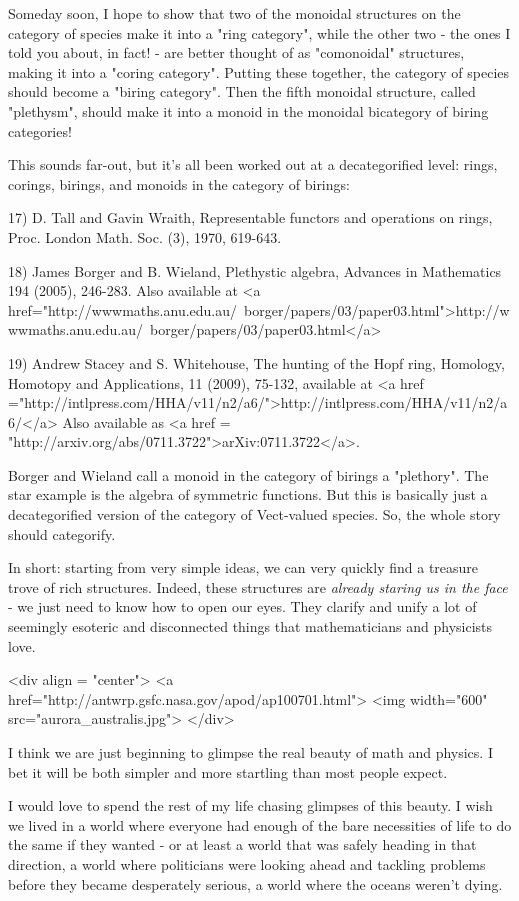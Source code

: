 Someday soon, I hope to show that two of the monoidal structures on
the category of species make it into a "ring category", while the
other two - the ones I told you about, in fact! - are better thought
of as "comonoidal" structures, making it into a "coring category".
Putting these together, the category of species should become a
"biring category".  Then the fifth monoidal structure, called
"plethysm", should make it into a monoid in the monoidal bicategory of
biring categories!

This sounds far-out, but it's all been worked out at a decategorified
level: rings, corings, birings, and monoids in the category of
birings:

17) D. Tall and Gavin Wraith, Representable functors and operations on
rings, Proc. London Math. Soc. (3), 1970, 619-643.

18) James Borger and B. Wieland, Plethystic algebra, Advances in
Mathematics 194 (2005), 246-283.  Also available at <a
href="http://wwwmaths.anu.edu.au/~borger/papers/03/paper03.html">http://wwwmaths.anu.edu.au/~borger/papers/03/paper03.html</a>

19) Andrew Stacey and S. Whitehouse, The hunting of the Hopf ring,
Homology, Homotopy and Applications, 11 (2009), 75-132, available at
<a href
="http://intlpress.com/HHA/v11/n2/a6/">http://intlpress.com/HHA/v11/n2/a6/</a>
Also available as <a href =
"http://arxiv.org/abs/0711.3722">arXiv:0711.3722</a>.

Borger and Wieland call a monoid in the category of birings a
"plethory".  The star example is the algebra of symmetric functions.
But this is basically just a decategorified version of the category of
Vect-valued species.  So, the whole story should categorify.

In short: starting from very simple ideas, we can very quickly find a
treasure trove of rich structures.  Indeed, these structures are
\emph{already staring us in the face} - we just need to know how to
open our eyes.  They clarify and unify a lot of seemingly esoteric and
disconnected things that mathematicians and physicists love.

<div align = "center">
<a href="http://antwrp.gsfc.nasa.gov/apod/ap100701.html">
<img width="600" src="aurora_australis.jpg">
</div>


I think we are just beginning to glimpse the real beauty of math and
physics. I bet it will be both simpler and more startling than most
people expect.

I would love to spend the rest of my life chasing glimpses of this
beauty.  I wish we lived in a world where everyone had enough of the
bare necessities of life to do the same if they wanted - or at least a
world that was safely heading in that direction, a world where
politicians were looking ahead and tackling problems before they
became desperately serious, a world where the oceans weren't dying.

